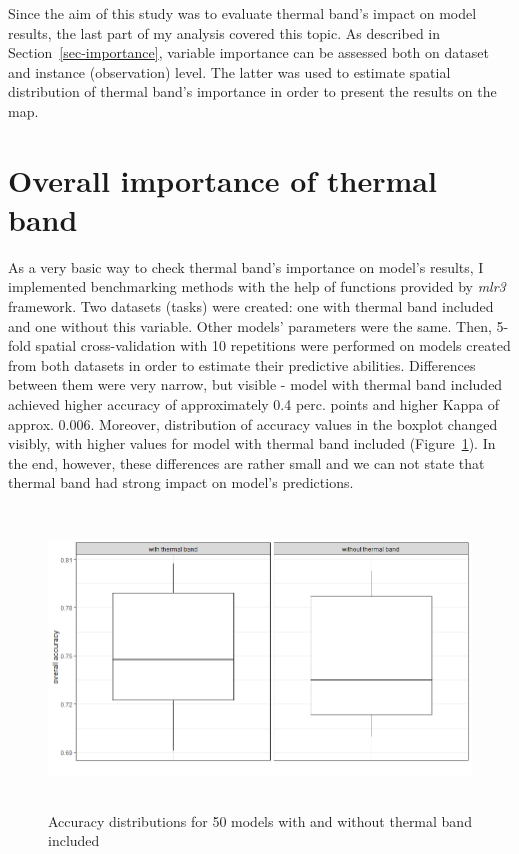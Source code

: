 \documentclass{amuthesis}
\begin{document}
Since the aim of this study was to evaluate thermal band's impact on
model results, the last part of my analysis covered this topic. As
described in Section~\ref{sec-importance}, variable importance can be
assessed both on dataset and instance (observation) level. The latter
was used to estimate spatial distribution of thermal band's importance
in order to present the results on the map.

\hypertarget{sec-imp-overall}{%
\section{Overall importance of thermal band}\label{sec-imp-overall}}

As a very basic way to check thermal band's importance on model's
results, I implemented benchmarking methods with the help of functions
provided by \emph{mlr3} framework. Two datasets (tasks) were created:
one with thermal band included and one without this variable. Other
models' parameters were the same. Then, 5-fold spatial cross-validation
with 10 repetitions were performed on models created from both datasets
in order to estimate their predictive abilities. Differences between
them were very narrow, but visible - model with thermal band included
achieved higher accuracy of approximately 0.4 perc. points and higher
Kappa of approx. 0.006. Moreover, distribution of accuracy values in the
boxplot changed visibly, with higher values for model with thermal band
included (Figure~\ref{fig-rycina12}). In the end, however, these
differences are rather small and we can not state that thermal band had
strong impact on model's predictions.

\begin{figure}[H]

{\centering \includegraphics[width=5.625in,height=3.125in]{./figures/model_comparison.png}

}

\caption{\label{fig-rycina12}Accuracy distributions for 50 models with
and without thermal band included}

\end{figure}
\end{document}
